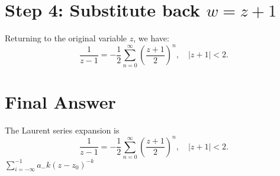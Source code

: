 \documentclass[12pt]{article}
\theoremstyle{definition} %
\theoremstyle{plain} %
\begin{document}
\section*{Step 4: Substitute back \(w=z+1\)}
Returning to the original variable \(z\), we have:
\[
\frac{1}{z-1} = -\frac{1}{2} \sum_{n=0}^{\infty} \left(\frac{z+1}{2}\right)^n, \quad |z+1| < 2.
\]

\section*{Final Answer}
The Laurent series expansion is
\[
\boxed{\frac{1}{z-1} = -\frac{1}{2}\sum_{n=0}^{\infty} \left(\frac{z+1}{2}\right)^n, \quad |z+1| < 2.}
\]
$\sum_{i=-\infty }^{-1} a_-k(z-z_0)^{-k}$ 
\end{document}
